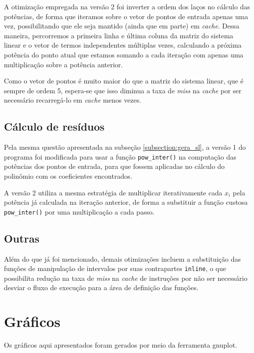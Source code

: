 \documentclass[a4paper, 11pt]{article}
\begin{document}
A otimização empregada na versão 2 foi inverter a ordem dos laços no cálculo
das potências, de forma que iteramos sobre o vetor de pontos de entrada apenas
uma vez, possibilitando que ele seja mantido (ainda que em parte) em
\textit{cache}. Dessa maneira, percorremos a primeira linha e última coluna da
matriz do sistema linear e o vetor de termos independentes múltiplas vezes,
calculando a próxima potência do ponto atual que estamos somando a cada
iteração com apenas uma multiplicação sobre a potência anterior.

Como o vetor de pontos é muito maior do que a matriz do sistema linear, que é
sempre de ordem 5, espera-se que isso diminua a taxa de \textit{miss} na
\textit{cache} por ser necessário recarregá-lo em \textit{cache} menos vezes.

\subsection{Cálculo de resíduos}
Pela mesma questão apresentada na subseção \ref{subsection:gera_sl}, a versão
1 do programa foi modificada para usar a função \texttt{pow\_inter()} na
computação das potências dos pontos de entrada, para que fossem aplicadas no
cálculo do polinômio com os coeficientes encontrados.

A versão 2 utiliza a mesma estratégia de multiplicar iterativamente cada $x_i$
pela potência já calculada na iteração anterior, de forma a substituir a
função custosa \texttt{pow\_inter()} por uma multiplicação a cada passo.

\subsection{Outras}
Além do que já foi mencionado, demais otimizações incluem a substituição das
funções de manipulação de intervalos por suas contrapartes \texttt{inline}, o
que possibilita redução na taxa de \textit{miss} na \textit{cache} de
instruções por não ser necessário desviar o fluxo de execução para a área de
definição das funções.

\section{Gráficos}
Os gráficos aqui apresentados foram gerados por meio da ferramenta gnuplot.
\def\path{../resultados/graficos}
\end{document}
